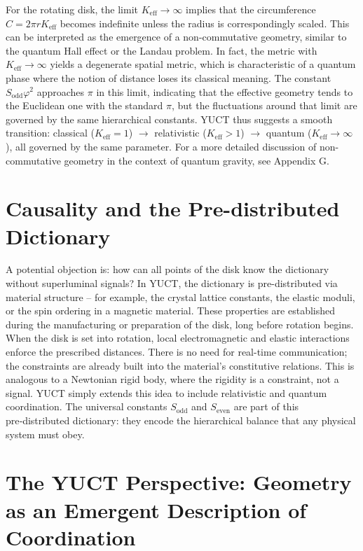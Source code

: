 \documentclass[12pt,a4paper]{article}
\newcommand{\Sodd}{S_{\mathrm{odd}}}
\newcommand{\Seven}{S_{\mathrm{even}}}
\begin{document}
	For the rotating disk, the limit \(K_{\mathrm{eff}} \to \infty\) implies that the circumference \(C = 2\pi r K_{\mathrm{eff}}\) becomes indefinite unless the radius is correspondingly scaled. This can be interpreted as the emergence of a non-commutative geometry, similar to the quantum Hall effect or the Landau problem. In fact, the metric with \(K_{\mathrm{eff}} \to \infty\) yields a degenerate spatial metric, which is characteristic of a quantum phase where the notion of distance loses its classical meaning. The constant \(\Sodd \varphi^2\) approaches \(\pi\) in this limit, indicating that the effective geometry tends to the Euclidean one with the standard \(\pi\), but the fluctuations around that limit are governed by the same hierarchical constants. YUCT thus suggests a smooth transition: classical (\(K_{\mathrm{eff}}=1\)) \(\rightarrow\) relativistic (\(K_{\mathrm{eff}}>1\)) \(\rightarrow\) quantum (\(K_{\mathrm{eff}}\to\infty\)), all governed by the same parameter. For a more detailed discussion of non-commutative geometry in the context of quantum gravity, see Appendix G.
	
	\section{Causality and the Pre-distributed Dictionary}
	\label{sec:causality}
	
	A potential objection is: how can all points of the disk know the dictionary without superluminal signals? In YUCT, the dictionary is pre-distributed via material structure -- for example, the crystal lattice constants, the elastic moduli, or the spin ordering in a magnetic material. These properties are established during the manufacturing or preparation of the disk, long before rotation begins. When the disk is set into rotation, local electromagnetic and elastic interactions enforce the prescribed distances. There is no need for real-time communication; the constraints are already built into the material's constitutive relations. This is analogous to a Newtonian rigid body, where the rigidity is a constraint, not a signal. YUCT simply extends this idea to include relativistic and quantum coordination. The universal constants \(\Sodd\) and \(\Seven\) are part of this pre‑distributed dictionary: they encode the hierarchical balance that any physical system must obey.
	

	
\section{The YUCT Perspective: Geometry as an Emergent Description of Coordination}
\end{document}
